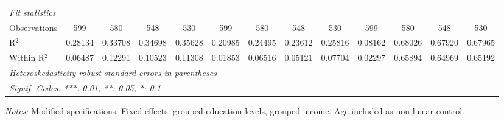 \begin{tabular}{lcccccccccccc}
   \midrule
   \emph{Fit statistics}\\
   Observations                              & 599      & 580      & 548      & 530      & 599      & 580      & 548      & 530      & 599      & 580                   & 548            & 530\\  
   R$^2$                                     & 0.28134  & 0.33708  & 0.34698  & 0.35628  & 0.20985  & 0.24495  & 0.23612  & 0.25816  & 0.08162  & 0.68026               & 0.67920        & 0.67965\\  
   Within R$^2$                              & 0.06487  & 0.12291  & 0.10523  & 0.11308  & 0.01853  & 0.06516  & 0.05121  & 0.07704  & 0.02297  & 0.65894               & 0.64969        & 0.65192\\  
   \midrule \midrule
   \multicolumn{13}{l}{\emph{Heteroskedasticity-robust standard-errors in parentheses}}\\
   \multicolumn{13}{l}{\emph{Signif. Codes: ***: 0.01, **: 0.05, *: 0.1}}\\
\end{tabular}
 
\par \raggedright 
\textit{Notes:} Modified specifications. Fixed effects: grouped education levels, grouped income. Age included as non-linear control.
\par\endgroup


